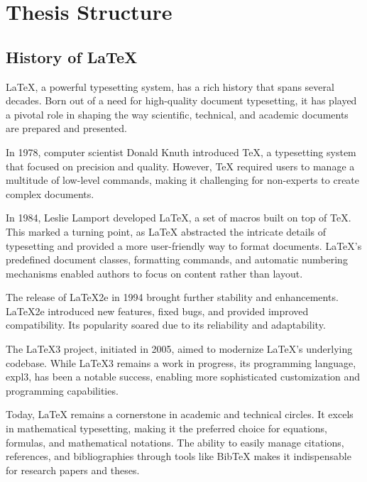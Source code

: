 % 
\chapter{Thesis Structure} %
\label{chap:Chapter1} %


%
\section{History of LaTeX} 

LaTeX, a powerful typesetting system, has a rich history that spans several decades. Born out of a need for high-quality document typesetting, it has played a pivotal role in shaping the way scientific, technical, and academic documents are prepared and presented.

In 1978, computer scientist Donald Knuth introduced TeX, a typesetting system that focused on precision and quality. However, TeX required users to manage a multitude of low-level commands, making it challenging for non-experts to create complex documents.

In 1984, Leslie Lamport developed LaTeX, a set of macros built on top of TeX. This marked a turning point, as LaTeX abstracted the intricate details of typesetting and provided a more user-friendly way to format documents. LaTeX's predefined document classes, formatting commands, and automatic numbering mechanisms enabled authors to focus on content rather than layout.

The release of LaTeX2e in 1994 brought further stability and enhancements. LaTeX2e introduced new features, fixed bugs, and provided improved compatibility. Its popularity soared due to its reliability and adaptability.

The LaTeX3 project, initiated in 2005, aimed to modernize LaTeX's underlying codebase. While LaTeX3 remains a work in progress, its programming language, expl3, has been a notable success, enabling more sophisticated customization and programming capabilities.

Today, LaTeX remains a cornerstone in academic and technical circles. It excels in mathematical typesetting, making it the preferred choice for equations, formulas, and mathematical notations. The ability to easily manage citations, references, and bibliographies through tools like BibTeX makes it indispensable for research papers and theses.


